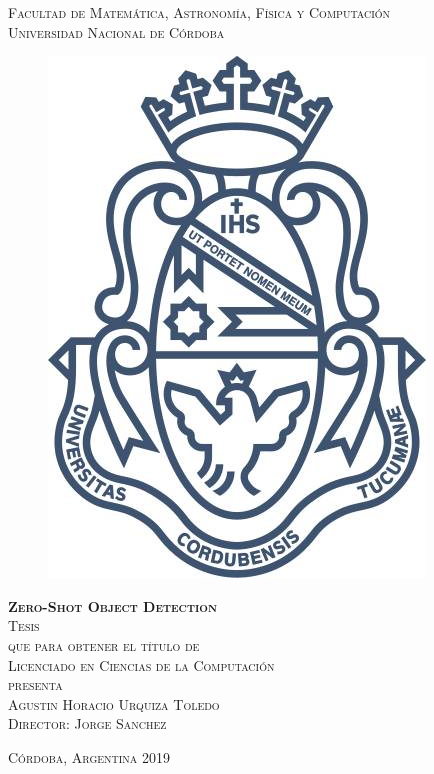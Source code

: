\documentclass[12pt,twosided]{book}
\begin{document}
\begin{titlepage}
\begin{center}

\textsc{\Large Facultad de Matemática, Astronomía, Física y Computación}\\[2em]

\textsc{Universidad Nacional de Córdoba}

\begin{figure}[h]
\begin{center}
\includegraphics[scale=0.2]{img/unc.jpg}
\end{center}
\end{figure}

\vspace{1em}

\textsc{\huge \textbf{Zero-Shot Object Detection}}\\[2em]

\textsc{\large Tesis}\\[1em]

\textsc{que para obtener el título de}\\[1em]

\textsc{Licenciado en Ciencias de la Computación}\\[1em]

\textsc{presenta}\\[1em]

\textsc{\Large Agustin Horacio Urquiza Toledo}\\[1em]

\textsc{\large Director: Jorge Sanchez}

\end{center}

\vspace*{\fill}
\textsc{Córdoba, Argentina \hspace*{\fill} 2019}

\end{titlepage}
\end{document}
